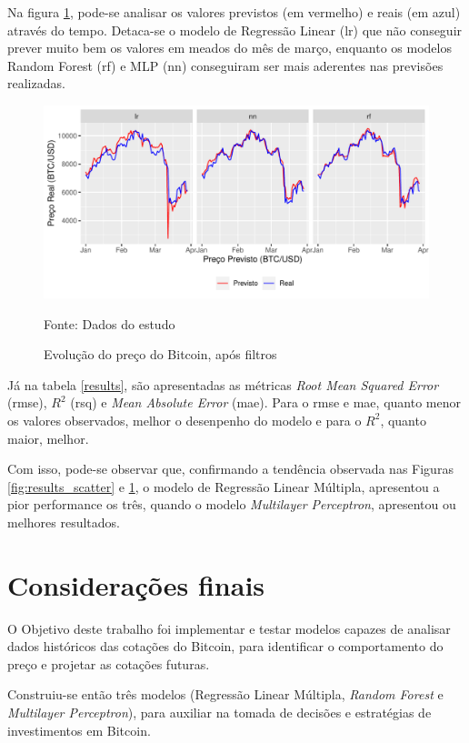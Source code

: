 \documentclass[12pt]{article}
\begin{document}
Na figura \ref{fig:results_line}, pode-se analisar os valores previstos (em vermelho)
e reais (em azul) através do tempo. Detaca-se o modelo de Regressão Linear (lr)
que não conseguir prever muito bem os valores em meados do mês de março, enquanto
os modelos Random Forest (rf) e MLP (nn) conseguiram ser mais aderentes nas 
previsões realizadas.


\begin{figure}[!ht]
  \centering
  \includegraphics[scale = 0.8]{img/results_line.pdf}
  \caption{Evolução do preço do Bitcoin, após filtros}
  Fonte: Dados do estudo
  \label{fig:results_line}
\end{figure}



Já na tabela \ref{results}, são apresentadas as métricas \textit{Root Mean 
Squared Error} (rmse), $R^{2}$ (rsq) e \textit{Mean Absolute Error} (mae). Para o 
rmse e mae, quanto menor os valores observados, melhor o desenpenho do modelo e 
para o $R^{2}$, quanto maior, melhor.

Com isso, pode-se observar que, confirmando a tendência observada nas Figuras 
\ref{fig:results_scatter} e \ref{fig:results_line}, o modelo de Regressão Linear
Múltipla, apresentou a pior performance os três, quando o modelo \textit{Multilayer
Perceptron}, apresentou ou melhores resultados.



\section{Considerações finais}

O Objetivo deste trabalho foi implementar e testar modelos capazes de analisar 
dados históricos das cotações do Bitcoin, para identificar o comportamento do 
preço e projetar as cotações futuras.

Construiu-se então três modelos (Regressão Linear Múltipla, \textit{Random Forest}
e \textit{Multilayer Perceptron}), para auxiliar na tomada de decisões e 
estratégias de investimentos em Bitcoin. 
\end{document}
